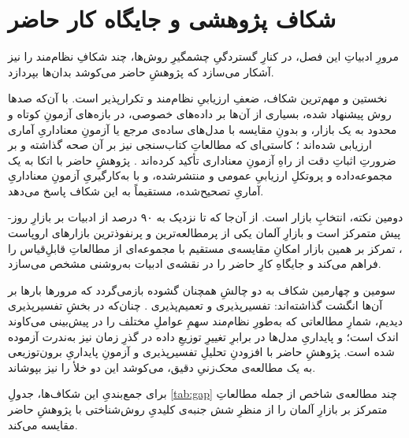\section{شکاف پژوهشی و جایگاه کار حاضر}

مرورِ ادبیاتِ این فصل، در کنارِ گستردگیِ چشمگیرِ روش‌ها، چند شکافِ نظام‌مند را
نیز آشکار می‌سازد که پژوهشِ حاضر می‌کوشد بدان‌ها بپردازد.

نخستین و مهم‌ترین شکاف، ضعفِ ارزیابیِ نظام‌مند و تکرارپذیر است. با آن‌که صدها روش
پیشنهاد شده، بسیاری از آن‌ها بر داده‌های خصوصی، در بازه‌های آزمونِ کوتاه و محدود
به یک بازار، و بدونِ مقایسه با مدل‌های ساده‌ی مرجع یا آزمونِ معناداریِ آماری
ارزیابی شده‌اند \cite{lago_forecasting_2021, chai_forecasting_2024}؛ کاستی‌ای که
مطالعاتِ کتاب‌سنجی نیز بر آن صحه گذاشته و بر ضرورتِ اثباتِ دقت از راهِ آزمونِ
معناداری تأکید کرده‌اند \cite{zema_models_2022}. پژوهشِ حاضر با اتکا به یک
مجموعه‌داده و پروتکلِ ارزیابیِ عمومی و منتشرشده، و با به‌کارگیریِ آزمونِ معناداریِ
آماریِ تصحیح‌شده، مستقیماً به این شکاف پاسخ می‌دهد.

دومین نکته، انتخابِ بازار است. از آن‌جا که تا نزدیک به ۹۰ درصد از ادبیات بر
بازارِ روز-پیش متمرکز است \cite{jedrzejewski_electricity_2022} و بازارِ آلمان
یکی از پرمطالعه‌ترین و پرنفوذترین بازارهای اروپاست \cite{poggi_electricity_2023}،
تمرکز بر همین بازار امکانِ مقایسه‌ی مستقیم با مجموعه‌ای از مطالعاتِ قابلِ‌قیاس را
فراهم می‌کند و جایگاهِ کارِ حاضر را در نقشه‌ی ادبیات به‌روشنی مشخص می‌سازد.

سومین و چهارمین شکاف به دو چالشِ همچنان گشوده بازمی‌گردد که مرورها بارها بر آن‌ها
انگشت گذاشته‌اند: تفسیرپذیری و تعمیم‌پذیری \cite{oconnor_review_2025}. چنان‌که در
بخشِ تفسیرپذیری دیدیم، شمارِ مطالعاتی که به‌طورِ نظام‌مند سهمِ عواملِ مختلف را در
پیش‌بینی می‌کاوند اندک است؛ و پایداریِ مدل‌ها در برابرِ تغییرِ توزیعِ داده در
گذرِ زمان نیز به‌ندرت آزموده شده است. پژوهشِ حاضر با افزودنِ تحلیلِ تفسیرپذیری و
آزمونِ پایداریِ برون‌توزیعی به یک مطالعه‌ی محک‌زنیِ دقیق، می‌کوشد این دو خلأ را
نیز بپوشاند.

برای جمع‌بندیِ این شکاف‌ها، جدولِ \ref{tab:gap} چند مطالعه‌ی شاخص  از
جمله مطالعاتِ متمرکز بر بازارِ آلمان  را از منظرِ شش جنبه‌ی کلیدیِ
روش‌شناختی با پژوهشِ حاضر مقایسه می‌کند.

